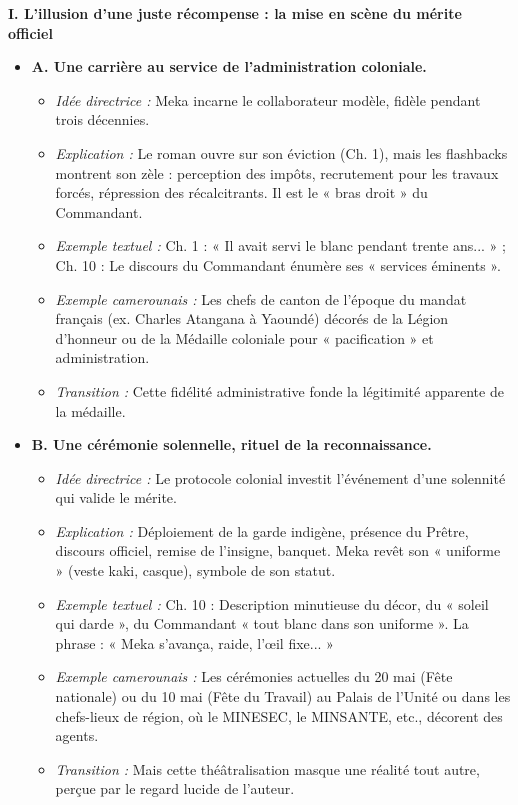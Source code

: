 \documentclass[11pt]{article}
\begin{document}
\begin{exoresolu}
\medskip
\noindent \textbf{I. L'illusion d'une juste récompense : la mise en scène du mérite officiel}
\begin{itemize}
    \item \textbf{A. Une carrière au service de l'administration coloniale.}
    \begin{itemize}
        \item \textit{Idée directrice :} Meka incarne le collaborateur modèle, fidèle pendant trois décennies.
        \item \textit{Explication :} Le roman ouvre sur son éviction (Ch. 1), mais les flashbacks montrent son zèle : perception des impôts, recrutement pour les travaux forcés, répression des récalcitrants. Il est le « bras droit » du Commandant.
        \item \textit{Exemple textuel :} Ch. 1 : « Il avait servi le blanc pendant trente ans... » ; Ch. 10 : Le discours du Commandant énumère ses « services éminents ».
        \item \textit{Exemple camerounais :} Les chefs de canton de l'époque du mandat français (ex. Charles Atangana à Yaoundé) décorés de la Légion d'honneur ou de la Médaille coloniale pour « pacification » et administration.
        \item \textit{Transition :} Cette fidélité administrative fonde la légitimité apparente de la médaille.
    \end{itemize}
    \item \textbf{B. Une cérémonie solennelle, rituel de la reconnaissance.}
    \begin{itemize}
        \item \textit{Idée directrice :} Le protocole colonial investit l'événement d'une solennité qui valide le mérite.
        \item \textit{Explication :} Déploiement de la garde indigène, présence du Prêtre, discours officiel, remise de l'insigne, banquet. Meka revêt son « uniforme » (veste kaki, casque), symbole de son statut.
        \item \textit{Exemple textuel :} Ch. 10 : Description minutieuse du décor, du « soleil qui darde », du Commandant « tout blanc dans son uniforme ». La phrase : « Meka s'avança, raide, l'œil fixe... »
        \item \textit{Exemple camerounais :} Les cérémonies actuelles du 20 mai (Fête nationale) ou du 10 mai (Fête du Travail) au Palais de l'Unité ou dans les chefs-lieux de région, où le MINESEC, le MINSANTE, etc., décorent des agents.
        \item \textit{Transition :} Mais cette théâtralisation masque une réalité tout autre, perçue par le regard lucide de l'auteur.
    \end{itemize}
\end{itemize}


\end{exoresolu}
\end{document}
